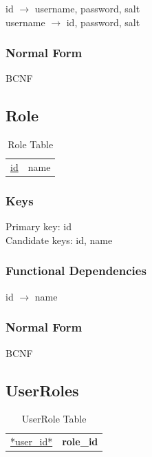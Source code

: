 \documentclass[11pt]{article}
\begin{document}
    id $\rightarrow$ username, password, salt\\
    username $\rightarrow$ id, password, salt
\subsubsection{Normal Form}
\label{sec-3-1-3}


    BCNF
\subsection{Role}
\label{sec-3-2}


\begin{table}[htb]
\caption{Role Table} 
\begin{center}
\begin{tabular}{ll}
 \underline{id}  &  name  \\
\end{tabular}
\end{center}
\end{table}
\subsubsection{Keys}
\label{sec-3-2-1}

    
    Primary key: id\\
    Candidate keys: id, name
\subsubsection{Functional Dependencies}
\label{sec-3-2-2}


    id $\rightarrow$ name
\subsubsection{Normal Form}
\label{sec-3-2-3}


    BCNF
\subsection{UserRoles}
\label{sec-3-3}


\begin{table}[htb]
\caption{UserRole Table} 
\begin{center}
\begin{tabular}{ll}
 \underline{*user\_id*}  &  \textbf{role\_id}  \\
\end{tabular}
\end{center}
\end{table}
\end{document}
